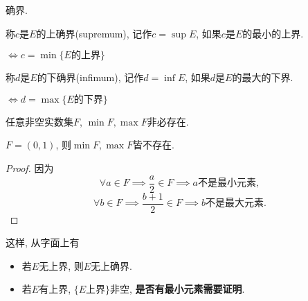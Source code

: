 
\begin{definition}
    确界.

    称$c$是$E$的上确界(supremum), 记作$c = \sup E$, 如果$c$是$E$的最小的上界.
    
    $\iff c = \min\{\text{$E$的上界}\}$

    称$d$是$E$的下确界(infimum), 记作$d = \inf E$, 如果$d$是$E$的最大的下界.
    
    $\iff d = \max\{\text{$E$的下界}\}$
\end{definition}

\begin{proposition}
    任意非空实数集$F$, $\min F, \max F$非必存在.
\end{proposition}
\begin{example}
    $F = (0,1)$, 则$\min F, \max F$皆不存在.
\end{example}
\begin{proof}
    因为
    \begin{equation}
        \forall a\in F \implies \frac{a}{2}\in F \implies a\text{不是最小元素},
    \end{equation}
    \begin{equation}
      \forall b \in F \implies \frac{b+1}{2} \in F \implies b\text{不是最大元素}.
    \end{equation}
\end{proof}

这样, 从字面上有
\begin{itemize}
    \item 若$E$无上界, 则$E$无上确界.
    
    \item 若$E$有上界, $\{\text{$E$上界}\}$非空, \textbf{是否有最小元素需要证明}.
\end{itemize}


